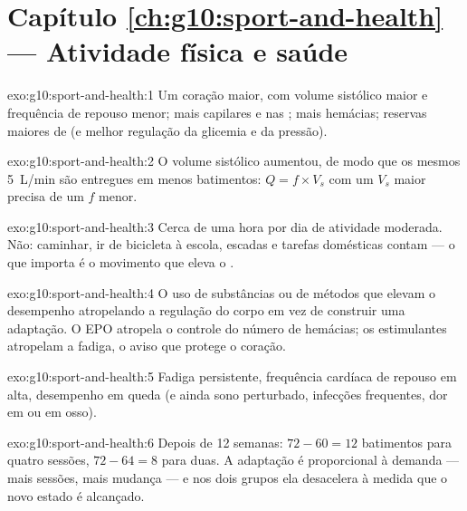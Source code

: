 \section*{Capítulo \ref{ch:g10:sport-and-health} --- Atividade física e saúde}

\begin{solution}{exo:g10:sport-and-health:1}
Um coração maior, com volume sistólico maior e frequência de repouso
menor; mais capilares e  nas ; mais
hemácias; reservas maiores de  (e melhor regulação da
glicemia e da pressão).
\end{solution}

\begin{solution}{exo:g10:sport-and-health:2}
O volume sistólico aumentou, de modo que os mesmos \qty{5}{L/min} são
entregues em menos batimentos: $Q = f \times V_s$ com um $V_s$ maior
precisa de um $f$ menor.
\end{solution}

\begin{solution}{exo:g10:sport-and-health:3}
Cerca de uma hora por dia de atividade moderada. Não: caminhar, ir de
bicicleta à escola, escadas e tarefas domésticas contam --- o que
importa é o movimento que eleva o .
\end{solution}

\begin{solution}{exo:g10:sport-and-health:4}
O uso de substâncias ou de métodos que elevam o desempenho atropelando
a regulação do corpo em vez de construir uma adaptação. O EPO atropela
o controle do número de hemácias; os estimulantes atropelam a fadiga, o
aviso que protege o coração.
\end{solution}

\begin{solution}{exo:g10:sport-and-health:5}
Fadiga persistente, frequência cardíaca de repouso em alta, desempenho
em queda (e ainda sono perturbado, infecções frequentes, dor em 
ou em osso).
\end{solution}

\begin{solution}{exo:g10:sport-and-health:6}
Depois de 12 semanas: $72 - 60 = 12$ batimentos para quatro sessões,
$72 - 64 = 8$ para duas. A adaptação é proporcional à demanda --- mais
sessões, mais mudança --- e nos dois grupos ela desacelera à medida que
o novo estado é alcançado.
\end{solution}

